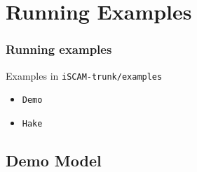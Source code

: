 

\section{Running Examples} 

\label{sec:running_examples} 
\begin{frame}
	\frametitle{Running examples} Examples in \texttt{iSCAM-trunk/examples} 
	\begin{itemize}
		\item \texttt{Demo} 
		\item \texttt{Hake} 
	\end{itemize}
\end{frame}

\subsection{Demo Model} 

